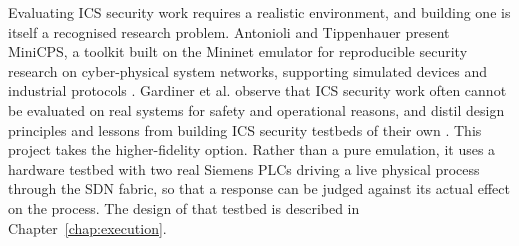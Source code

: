 Evaluating ICS security work requires a realistic environment, and building one is itself a recognised research problem. Antonioli and Tippenhauer present MiniCPS, a toolkit built on the Mininet emulator for reproducible security research on cyber-physical system networks, supporting simulated devices and industrial protocols \cite{antonioli2015minicps}. Gardiner et al. observe that ICS security work often cannot be evaluated on real systems for safety and operational reasons, and distil design principles and lessons from building ICS security testbeds of their own \cite{gardiner2019oops}. This project takes the higher-fidelity option. Rather than a pure emulation, it uses a hardware testbed with two real Siemens PLCs driving a live physical process through the SDN fabric, so that a response can be judged against its actual effect on the process. The design of that testbed is described in Chapter~\ref{chap:execution}.
